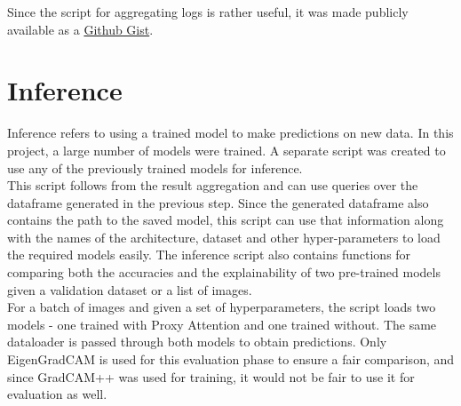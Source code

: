 Since the script for aggregating logs is rather useful, it was made publicly available as a \href{https://gist.github.com/SubhadityaMukherjee/58cbdf324812175233e91993b720e0bc}{Github Gist}.

\section{Inference}
Inference refers to using a trained model to make predictions on new data. In this project, a large number of models were trained. A separate script was created to use any of the previously trained models for inference.\\
This script follows from the result aggregation and can use queries over the dataframe generated in the previous step. Since the generated dataframe also contains the path to the saved model, this script can use that information along with the names of the architecture, dataset and other hyper-parameters to load the required models easily. 
The inference script also contains functions for comparing both the accuracies and the explainability of two pre-trained models given a validation dataset or a list of images.\\
For a batch of images and given a set of hyperparameters, the script loads two models - one trained with Proxy Attention and one trained without. The same dataloader is passed through both models to obtain predictions. Only EigenGradCAM is used for this evaluation phase to ensure a fair comparison, and since GradCAM++ was used for training, it would not be fair to use it for evaluation as well. 